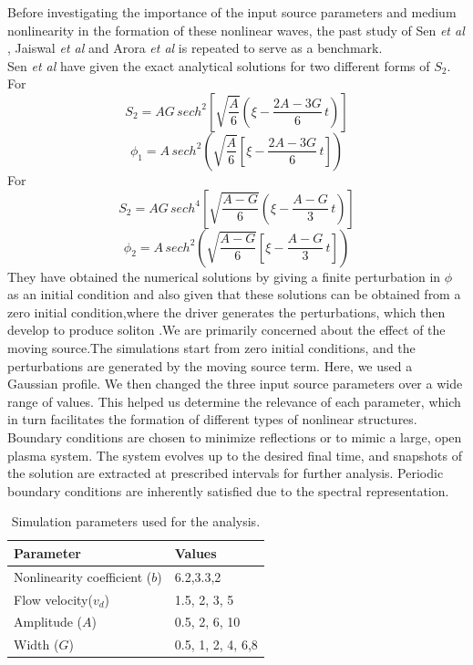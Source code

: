 \documentclass[%
 aip,
 amsmath,amssymb,
 reprint,%
]{revtex4-1}
\begin{document}
Before investigating the importance of the input source parameters and medium nonlinearity in the formation of these nonlinear waves, the past study of Sen \textit{et al} \cite{r1}, Jaiswal \textit{et al}\cite{r3} and Arora \textit{et al} \cite{r5} is repeated to serve as a benchmark.\\
Sen \textit{et al} \cite{r1} have given the  exact analytical solutions for two different forms of $S_2$.\\
For \[
S_2 = A G \, sech^{2}\!\left[
\sqrt{\frac{A}{6}}
\left(\xi - \frac{2A - 3G}{6}\, t
\right)
\right]
\]
\[
\phi_1
= A\,sech^{2}\!\left(
\sqrt{\frac{A}{6}}
\left[
\xi - \frac{2A - 3G}{6}\, t
\right]
\right)
\]
For\[
S_2 = A G \, sech^{4}\!\left[
\sqrt{\frac{A-G}{6}}
\left(\xi - \frac{A - G}{3}\, t
\right)
\right]
\]
\[
\phi_2
= A\,sech^{2}\!\left(
\sqrt{\frac{A-G}{6}}
\left[
\xi - \frac{A - G}{3}\, t
\right]
\right)
\]
They have obtained the numerical solutions by giving a finite perturbation in $\phi$ as an initial condition and also given that these solutions can be obtained from a zero initial condition,where the driver generates the perturbations, which then develop to produce  soliton .We are primarily concerned about the effect of the moving source.The simulations start from zero initial conditions, and the perturbations are generated by the moving source term. Here, we used a Gaussian profile.  We then changed the three input  source parameters over a wide range of values. This helped us determine the relevance of each parameter, which in turn facilitates the formation of different types of nonlinear structures. Boundary conditions are chosen to minimize reflections or to mimic a large, open plasma system. The system evolves up to the desired final time, and snapshots of the solution are extracted at prescribed intervals for further analysis. Periodic boundary conditions are inherently satisfied due to the spectral representation.\\

\begin{table}[h]
\caption{Simulation parameters used for the analysis.}
\label{tab:parameters}
\centering
\begin{tabular}{ll}
\hline\hline
Parameter & Values \\ \hline
Nonlinearity coefficient ($b$) & 6.2,3.3,2 \\
Flow velocity($v_d$) &  1.5, 2, 3, 5 \\
Amplitude ($A$) & 0.5, 2, 6, 10 \\
Width ($G$) & 0.5, 1, 2, 4, 6,8 \\ 
\hline\hline
\end{tabular}                                                       
\end{table}
\end{document}
